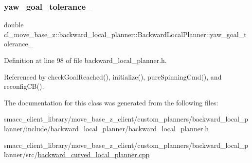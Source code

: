 \subsubsection{\texorpdfstring{yaw\+\_\+goal\+\_\+tolerance\+\_\+}{yaw\_goal\_tolerance\_}}
{\footnotesize\ttfamily double cl\+\_\+move\+\_\+base\+\_\+z\+::backward\+\_\+local\+\_\+planner\+::\+Backward\+Local\+Planner\+::yaw\+\_\+goal\+\_\+tolerance\+\_\+\hspace{0.3cm}{\ttfamily [private]}}



Definition at line 98 of file backward\+\_\+local\+\_\+planner.\+h.



Referenced by check\+Goal\+Reached(), initialize(), pure\+Spinning\+Cmd(), and reconfig\+C\+B().



The documentation for this class was generated from the following files\+:\begin{DoxyCompactItemize}
\item 
smacc\+\_\+client\+\_\+library/move\+\_\+base\+\_\+z\+\_\+client/custom\+\_\+planners/backward\+\_\+local\+\_\+planner/include/backward\+\_\+local\+\_\+planner/\hyperlink{backward__local__planner_8h}{backward\+\_\+local\+\_\+planner.\+h}\item 
smacc\+\_\+client\+\_\+library/move\+\_\+base\+\_\+z\+\_\+client/custom\+\_\+planners/backward\+\_\+local\+\_\+planner/src/\hyperlink{backward__curved__local__planner_8cpp}{backward\+\_\+curved\+\_\+local\+\_\+planner.\+cpp}\end{DoxyCompactItemize}

